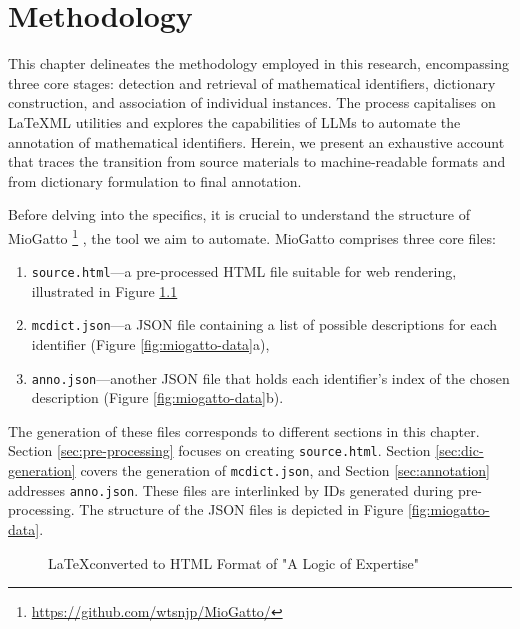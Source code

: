 \chapter{Methodology}\label{chapter:methods}

This chapter delineates the methodology employed in this research, encompassing three core stages: detection and retrieval of mathematical identifiers, dictionary construction, and association of individual instances. The process capitalises on \LaTeX ML utilities and explores the capabilities of \ac{LLMs} to automate the annotation of mathematical identifiers. Herein, we present an exhaustive account that traces the transition from source materials to machine-readable formats and from dictionary formulation to final annotation. 

Before delving into the specifics, it is crucial to understand the structure of MioGatto \footnote{\url{https://github.com/wtsnjp/MioGatto/}} \citep{asakura2021miogatto}, the tool we aim to automate. MioGatto comprises three core files: 
\begin{enumerate}
    \item \texttt{source.html}—a pre-processed HTML file suitable for web rendering, illustrated in Figure \ref{fig:miogatto-sources}
    \item \texttt{mcdict.json}—a JSON file containing a list of possible descriptions for each identifier (Figure \ref{fig:miogatto-data}a), 
    \item \texttt{anno.json}—another JSON file that holds each identifier's index of the chosen description (Figure \ref{fig:miogatto-data}b).
\end{enumerate}

The generation of these files corresponds to different sections in this chapter. Section \ref{sec:pre-processing} focuses on creating \texttt{source.html}. Section \ref{sec:dic-generation} covers the generation of \texttt{mcdict.json}, and Section \ref{sec:annotation} addresses \texttt{anno.json}. These files are interlinked by IDs generated during pre-processing. The structure of the JSON files is depicted in Figure \ref{fig:miogatto-data}.

\begin{figure}[htpb]
  \centering
    \begin{minipage}{1\textwidth}
      
    \end{minipage}
  \caption[LaTeXML Pre-processing]{\LaTeX \space converted to HTML Format of "A Logic of Expertise" \citep{singleton2021logic}}\label{fig:miogatto-sources}
\end{figure}

